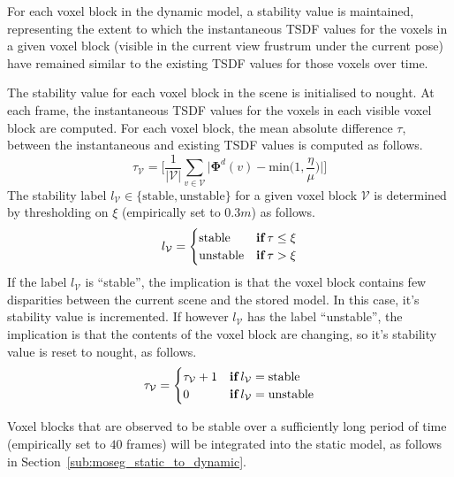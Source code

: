 For each voxel block in the dynamic model, a stability value is maintained, 
representing the extent to which the instantaneous TSDF values for the voxels 
in a given voxel block (visible in the current view frustrum under the current 
pose) have remained similar to the existing TSDF values for those voxels
over time.

The stability value for each voxel block in the scene is initialised to nought.
At each frame, the instantaneous TSDF values for the voxels in each visible
voxel block are computed. For each voxel block, the mean absolute difference
\( \tau \), between the instantaneous and existing TSDF values is computed as
follows.
\begin{equation}
  \label{eqn:moseg_stability_value}
  \tau_{\mathcal{V}} = \Bigg[ \frac{1}{|\mathcal{V}|} \sum_{v \in \mathcal{V}}
  \bigg|\bm{\Phi}^{d}(v) - \text{min}\bigg(1, \frac{\eta}{\mu}\bigg)\bigg| \Bigg]
\end{equation}
The stability label \( l_{\mathcal{V}} \in \{\text{stable}, \text{unstable}\} \) for
a given voxel block \(\mathcal{V}\) is determined by thresholding on \( \xi \) 
(empirically set to \(0.3m\)) as follows.
\begin{equation}
  \label{eqn:moseg_stability_labelling}
  l_{\mathcal{V}} =
  \begin{cases}
    \text{stable} & \textbf{if} \mkern4mu \tau \leq \xi \\
    \text{unstable} & \textbf{if} \mkern4mu \tau > \xi
  \end{cases}
\end{equation}
If the label \(l_{\mathcal{V}}\) is ``stable'', the implication is that the voxel
block contains few disparities between the current scene and the stored model.
In this case, it's stability value is incremented. If however
\(l_{\mathcal{V}}\) has the label ``unstable'', the implication is that the
contents of the voxel block are changing, so it's stability value is reset to
nought, as follows.
\begin{equation}
  \label{eqn:moseg_stability_update}
  \tau_{\mathcal{V}} =
  \begin{cases}
    \tau_{\mathcal{V}} + 1 & \textbf{if} \mkern4mu l_{\mathcal{V}} =
    \text{stable}\\
    0 & \textbf{if} \mkern4mu l_{\mathcal{V}} = \text{unstable}
  \end{cases}
\end{equation}

Voxel blocks that are observed to be stable over a sufficiently long period of
time (empirically set to \(40\) frames) will be integrated into the static model,
as follows in Section~\ref{sub:moseg_static_to_dynamic}.

